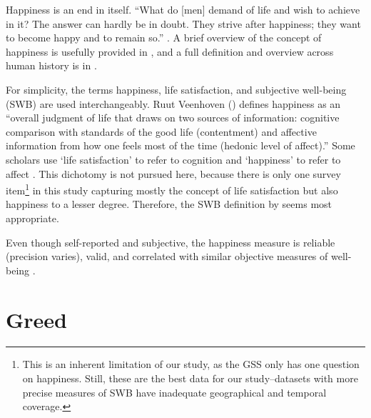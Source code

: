 \documentclass[10pt, letterpaper]{article}
\begin{document}
\begin{spacing}{1.8}

Happiness is an end in itself. ``What do [men] demand of life and wish to
achieve in it? The answer can hardly be in doubt. They strive after happiness;
they want to become happy and to remain so.'' \citep[][p. 52]{freud30}. 
A brief overview of the concept of happiness is usefully provided in
\citet{mcmahon05}, and a full definition and overview across human history is in \citet{mcmahon06}.

For simplicity, the terms happiness, life satisfaction, and
subjective well-being (SWB) are used interchangeably.
Ruut Veenhoven (\citeyear[p. 2]{veenhoven08}) defines happiness as an ``overall judgment of life that draws on two sources of information: cognitive comparison with standards of the good life (contentment) and affective information from how one feels most of the time (hedonic level of affect).''
Some scholars use `life satisfaction' to  refer to cognition and `happiness' to
refer to affect \citep[e.g.,][]{dorahy98etal}. This dichotomy is not pursued here, because there is only one survey item\footnote{This is an inherent limitation of our
study, as the GSS only has one question on happiness. Still, these are the best data for our study--datasets with more precise measures of SWB have inadequate geographical and temporal coverage.} in this study capturing mostly the concept of life satisfaction but also happiness to a lesser degree. Therefore, the SWB definition by \citet{veenhoven08} seems most appropriate.
 
Even though self-reported and subjective, the happiness measure is reliable
(precision varies), valid, and correlated with similar objective measures of
well-being \citep{myers00,layard05}.


\section{Greed}




\end{spacing}
\end{document}
